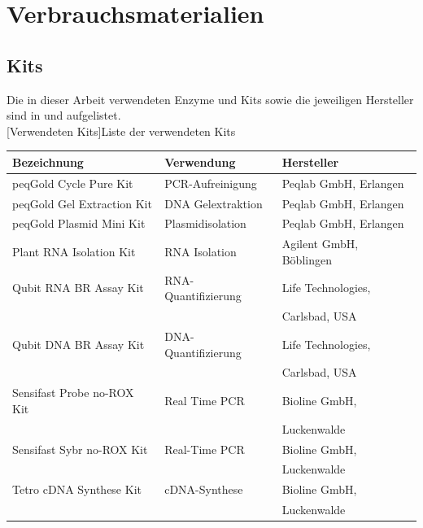 \section{Verbrauchsmaterialien}
\subsection{Kits}
Die in dieser Arbeit verwendeten Enzyme und Kits sowie die jeweiligen Hersteller sind in  und  aufgelistet.\\
[Verwendeten Kits]{Liste der verwendeten Kits}
\label{tab:Kits}
\begin{tabular}{l
l
l
}
\toprule
Bezeichnung & Verwendung&Hersteller \\ 
\midrule
peqGold Cycle Pure Kit & PCR-Aufreinigung  & Peqlab GmbH, Erlangen\\  
peqGold Gel Extraction Kit & DNA Gelextraktion & Peqlab GmbH, Erlangen \\
peqGold Plasmid Mini Kit & Plasmidisolation & Peqlab GmbH, Erlangen\\
Plant RNA Isolation Kit & RNA Isolation & Agilent GmbH, Böblingen\\ 
Qubit RNA BR Assay Kit & RNA-Quantifizierung & Life Technologies,\\
&&Carlsbad, USA \\ 
Qubit DNA BR Assay Kit & DNA-Quantifizierung & Life Technologies,\\
& & Carlsbad, USA \\ 
Sensifast Probe no-ROX Kit & Real Time PCR & Bioline GmbH,\\ 
&&Luckenwalde\\
Sensifast Sybr no-ROX Kit & Real-Time PCR & Bioline GmbH, \\
&&Luckenwalde\\
Tetro cDNA Synthese Kit & cDNA-Synthese & Bioline GmbH, \\
&&Luckenwalde\\
\bottomrule
\end{tabular}
\vspace{12pt}
